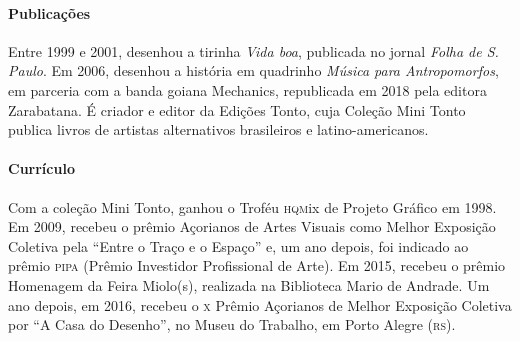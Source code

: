 \documentclass[11pt]{extarticle}
\begin{document}
\reversemarginpar
\marginparwidth=5cm



\paragraph{Publicações} Entre 1999 e 2001, desenhou a tirinha \textit{Vida boa}, publicada no jornal \textit{Folha de S.\,Paulo}. Em 2006, desenhou a história em quadrinho \textit{Música para Antropomorfos}, em parceria com a banda goiana Mechanics, republicada em 2018 pela editora Zarabatana. É criador e editor da Edições Tonto, cuja Coleção Mini Tonto publica livros de artistas alternativos brasileiros e latino-americanos.

\paragraph{Currículo} Com a coleção Mini Tonto, ganhou o Troféu \textsc{hqm}ix de Projeto Gráfico em 1998. Em 2009, recebeu o prêmio Açorianos de Artes Visuais como Melhor Exposição Coletiva pela “Entre o Traço e o Espaço” e, um ano depois, foi indicado ao prêmio \textsc{pipa} (Prêmio Investidor Profissional de Arte). Em 2015, recebeu o prêmio Homenagem da Feira Miolo(s), realizada na Biblioteca Mario de Andrade. Um ano depois, em 2016, recebeu o \textsc{x} Prêmio Açorianos de Melhor Exposição Coletiva por “A Casa do Desenho”, no Museu do Trabalho, em Porto Alegre (\textsc{rs}).
\end{document}

